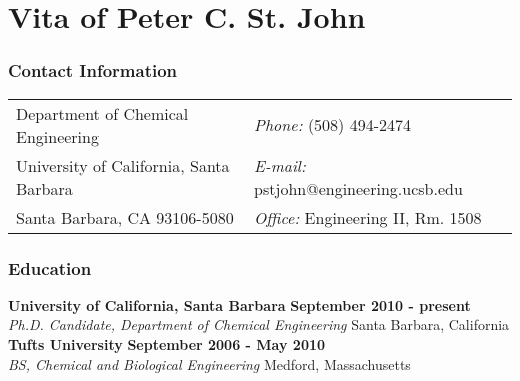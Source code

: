 {
\singlespace
\setlength{\parindent}{0em}
\setlength{\parskip}{1em}

\chapter*{Vita of Peter C. St. John}

\subsection*{Contact Information}
\vspace{.05in}
\begin{tabular}{@{}p{3.5in}p{4in}}
Department of Chemical Engineering   & {\it Phone:}  (508) 494-2474\\             
University of California, Santa Barbara & {\it E-mail:} pstjohn@engineering.ucsb.edu\\       
Santa Barbara, CA 93106-5080 & {\it Office:} Engineering II, Rm. 1508\\
\end{tabular}


\subsection*{Education}
  {\bf University of California, Santa Barbara} \hfill {\bf September 2010 - present} \\
  {\em Ph.D. Candidate, Department of Chemical Engineering} \hfill Santa Barbara,
  California \\[-3ex]

  {\bf Tufts University}  \hfill {\bf September 2006 - May 2010}\\
  {\em BS, Chemical and Biological Engineering} \hfill Medford,
  Massachusetts\\[-3ex]

}
